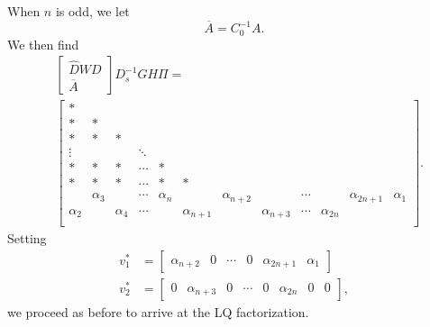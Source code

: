 When $n$ is odd, we let
%
\begin{equation}
    \overline{A} = C_{0}^{-1}A.
\end{equation}
%
We then find
%
\begin{align}
    &\begin{bmatrix} \widehat{D}WD \\ \overline{A} \end{bmatrix}D_{s}^{-1}GH\Pi
        = \nonumber\\
    &\begin{bmatrix}
            * & \\
            * & * & \\
            * & * & * & \\
            \vdots &   &   & \ddots \\
            * & * & * & \cdots & * & \\
            * & * & * & \cdots & * & * & \\
            & \alpha_{3} & & \cdots & \alpha_{n} &
                & \alpha_{n+2} & & \cdots & & \alpha_{2n+1} & \alpha_{1} \\
            \alpha_{2} & & \alpha_{4} & \cdots & & \alpha_{n+1} & &
                \alpha_{n+3} & \cdots & \alpha_{2n} & & \\
            \end{bmatrix}.
    \label{eq:CV_D_1D_2n_E_F1_L_odd}
\end{align}
%
Setting
%
\begin{align}
    v_{1}^{*} &= \begin{bmatrix} \alpha_{n+2} & 0 & \cdots &
                0 & \alpha_{2n+1} & \alpha_{1} \end{bmatrix} \nonumber\\
    v_{2}^{*} &= \begin{bmatrix} 0 & \alpha_{n+3} & 0 & \cdots & 0 &
                \alpha_{2n} & 0 & 0 \end{bmatrix},
\end{align}
%
we proceed as before to arrive at the LQ factorization.


